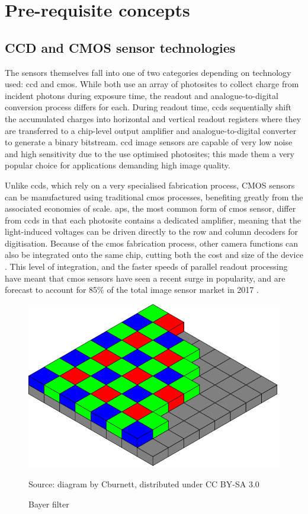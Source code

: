 \documentclass[a4paper]{report}
\begin{document}
\section{Pre-requisite concepts}

\subsection{CCD and CMOS sensor technologies}

The sensors themselves fall into one of two categories depending on technology used: \gls{ccd} and \gls{cmos}. While both use an array of photosites to collect charge from incident photons during exposure time, the readout and analogue-to-digital conversion process differs for each. During readout time, \glspl{ccd} sequentially shift the accumulated charges into horizontal and vertical readout registers where they are transferred to a chip-level output amplifier and analogue-to-digital converter to generate a binary bitstream. \gls{ccd} image sensors are capable of very low noise and high sensitivity due to the use optimised photosites; this made them a very popular choice for applications demanding high image quality.

Unlike \glspl{ccd}, which rely on a very specialised fabrication process, CMOS sensors can be manufactured using traditional \gls{cmos} processes, benefiting greatly from the associated economies of scale. \gls{aps}, the most common form of \gls{cmos} sensor, differ from \glspl{ccd} in that each photosite contains a dedicated amplifier, meaning that the light-induced voltages can be driven directly to the row and column decoders for digitisation. Because of the \gls{cmos} fabrication process, other camera functions can also be integrated onto the same chip, cutting both the cost and size of the device \cite{10_ge_2012}.  This level of integration, and the faster speeds of parallel readout processing have meant that \gls{cmos} sensors have seen a recent surge in popularity, and are forecast to account for 85\% of the total image sensor market in 2017 \cite{11_ic_insights_2013}.

\begin{figure}
  \centering
  \includegraphics[width=1\textwidth]{bayer_pattern.png}\par
Source: diagram by Cburnett, distributed under CC BY-SA 3.0
  \caption{Bayer filter}
  \label{fig:bayer_pattern}
\end{figure}
\end{document}
